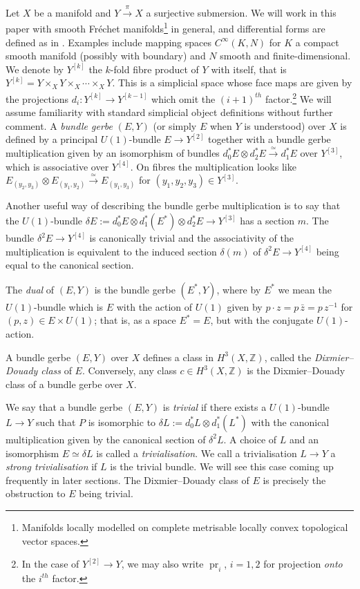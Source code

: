 \documentclass[12pt]{amsart}
\DeclareMathOperator{\pr}{pr}
\theoremstyle{plain}
\theoremstyle{definition}
\theoremstyle{remark}
\numberwithin{equation}{section}
\newcommand{\ZZ}{{\mathbb Z}}
\renewcommand{\d}{\delta}
\newcommand{\<}{\langle}
\renewcommand{\>}{\rangle}
\begin{document}
Let $X$ be a manifold and $Y \xrightarrow{\pi} X$ a surjective submersion. 
We will work in this paper with smooth Fr\'echet manifolds\footnote{Manifolds locally modelled on complete metrisable locally convex topological vector spaces.} in general, and differential forms are defined as in \cite[Appendix E]{Schmeding_book}. 
Examples include mapping spaces $C^\infty(K,N)$ for $K$ a compact smooth manifold (possibly with boundary) and $N$ smooth and finite-dimensional.
We denote by $Y^{[k]}$ the $k$-fold fibre product of $Y$ with itself, that is $Y^{[k]} = Y \times_X Y \times_X \cdots \times_X Y$.
This is a simplicial space whose face maps are given by the projections $d_i \colon Y^{[k]} \to Y^{[k-1]}$ which omit the $(i+1)^{th}$ factor.\footnote{In the case of $Y^{[2]}\to Y$, we may also write $\pr_i$, $i=1,2$ for projection \emph{onto} the $i^{th}$ factor.} 
We will assume familiarity with standard simplicial object definitions without further comment.
A \emph{bundle gerbe} $(E, Y)$ (or simply $E$ when $Y$ is understood) over $X$ is defined by a principal $U(1)$-bundle $E \to Y^{[2]}$ together with a bundle gerbe multiplication given by an isomorphism of bundles $d_0^*E \otimes d_2^*E \xrightarrow{\simeq} d_1^*E$ over $Y^{[3]}$, which is associative over $Y^{[4]}$. 
On fibres the multiplication looks like $E_{(y_2, y_3)} \otimes E_{(y_1, y_2)} \xrightarrow{\simeq}  E_{(y_1, y_3)}$ for $(y_1, y_2, y_3) \in Y^{[3]}$.

Another useful way of describing the bundle gerbe multiplication is to say that the $U(1)$-bundle $\delta E := d_0^*E \otimes d_1^*(E^*) \otimes d_2^*E \to Y^{[3]}$ has a section $m$. 
The bundle $\delta^2 E \to Y^{[4]}$ is canonically trivial and the associativity of the multiplication is equivalent to the induced section $\delta(m)$  of $\delta^2 E \to Y^{[4]}$ being equal to the canonical section.


The \emph{dual} of $(E, Y)$ is the bundle gerbe $(E^*, Y)$, where by
$E^*$ we mean the $U(1)$-bundle which is $E$ with the action of $U(1)$
given by $p \cdot z = p \, \bar z = p \, z^{-1}$ for $(p, z) \in E \times U(1)$; that is, as a space $E^*
= E$, but with the conjugate $U(1)$-action.


A bundle gerbe $(E, Y)$ over $X$ defines a class in $H^3(X, \ZZ)$, called the \emph{Dixmier--Douady class} of $E$.
Conversely, any class $c\in H^3(X,\ZZ)$ is the Dixmier--Douady class of a bundle gerbe over $X$.


We say that a bundle gerbe $(E, Y)$ is \emph{trivial} if there exists a $U(1)$-bundle $L \to Y$ such that $P$ is isomorphic to $ \d L := d_0^*L \otimes d_1^*(L^*)$ with the canonical multiplication given by the canonical section of $\d^2 L$. 
A choice of $L$ and an isomorphism $E \simeq \d L$ is called a \emph{trivialisation}. We call a trivialisation $L \to Y$ a \emph{strong trivialisation} if $L$ is the trivial bundle. We will see this case coming up frequently in later sections. 
The Dixmier--Douady class of $E$ is precisely the obstruction to $E$ being trivial.
\end{document}
